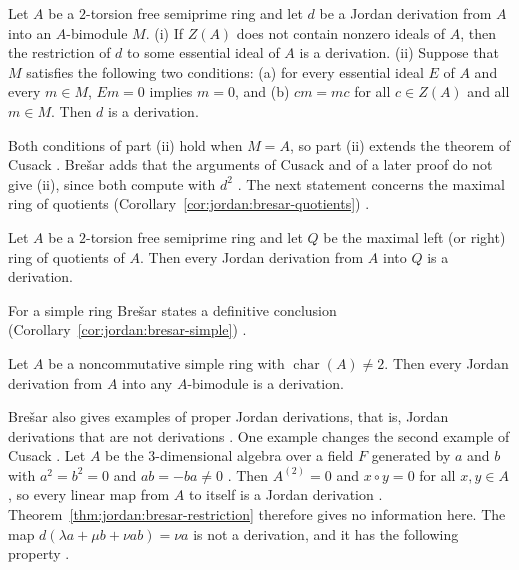 \begin{corollary}\label{cor:jordan:bresar-essential}
Let $A$ be a $2$-torsion free semiprime ring and let $d$ be a Jordan derivation from $A$
into an $A$-bimodule $M$.
(i) If $Z(A)$ does not contain nonzero ideals of $A$, then the restriction of $d$ to
some essential ideal of $A$ is a derivation.
(ii) Suppose that $M$ satisfies the following two conditions: (a) for every essential
ideal $E$ of $A$ and every $m\in M$, $Em=0$ implies $m=0$, and (b) $cm=mc$ for all
$c\in Z(A)$ and all $m\in M$. Then $d$ is a derivation.
\end{corollary}

Both conditions of part (ii) hold when $M=A$, so part (ii) extends the theorem of
Cusack \cite[p.~416]{Bresar2005}. Brešar adds that the arguments of Cusack and of a later
proof do not give (ii), since both compute with $d^{2}$ \cite[p.~416]{Bresar2005}.
The next statement concerns the maximal ring of quotients (Corollary~\ref{cor:jordan:bresar-quotients}) \cite[Corollary~3.9, p.~417]{Bresar2005}.

\begin{corollary}\label{cor:jordan:bresar-quotients}
Let $A$ be a $2$-torsion free semiprime ring and let $Q$ be the maximal left (or right)
ring of quotients of $A$. Then every Jordan derivation from $A$ into $Q$ is a
derivation.
\end{corollary}

For a simple ring Brešar states a definitive conclusion (Corollary~\ref{cor:jordan:bresar-simple}) \cite[p.~417]{Bresar2005}.

\begin{corollary}\label{cor:jordan:bresar-simple}
Let $A$ be a noncommutative simple ring with $\operatorname{char}(A)\neq2$. Then every
Jordan derivation from $A$ into any $A$-bimodule is a derivation.
\end{corollary}


Brešar also gives examples of proper Jordan derivations, that is, Jordan derivations
that are not derivations \cite[p.~411]{Bresar2005}. One example changes the second example of
Cusack \cite[\S4.2, p.~419]{Bresar2005}. Let $A$ be the $3$-dimensional algebra over a field $F$ generated by $a$ and
$b$ with $a^{2}=b^{2}=0$ and $ab=-ba\neq0$ \cite[\S4.2, p.~419]{Bresar2005}. Then
$A^{(2)}=0$ and $x\circ y=0$ for all $x,y\in A$, so every linear map from $A$ to itself
is a Jordan derivation \cite[\S4.2, p.~419]{Bresar2005}. Theorem~\ref{thm:jordan:bresar-restriction}
therefore gives no information here. The map $d(\lambda a+\mu b+\nu ab)=\nu a$ is not a
derivation, and it has the following property \cite[\S4.2, p.~419]{Bresar2005}.

